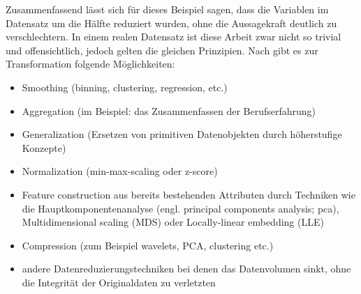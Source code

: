 Zusammenfassend lässt sich für dieses Beispiel sagen, dass die Variablen im Datensatz um die Hälfte reduziert wurden, ohne die Aussagekraft deutlich zu verschlechtern. In einem realen Datensatz ist diese Arbeit zwar nicht so trivial und offensichtlich, jedoch gelten die gleichen Prinzipien.\newline
Nach \citep[S.~71; veränderte Version]{swamynathan_mastering_2017} gibt es zur Transformation folgende Möglichkeiten:
\begin{itemize}
\item Smoothing (binning, clustering, regression, etc.)
\item Aggregation (im Beispiel: das Zusammenfassen der Berufserfahrung)
\item Generalization (Ersetzen von primitiven Datenobjekten durch höherstufige Konzepte)
\item Normalization (min-max-scaling oder z-score)
\item Feature construction aus bereits bestehenden Attributen durch Techniken wie die Hauptkomponentenanalyse (engl. principal components analysis; \gls{pca}), Multidimensional scaling (MDS) oder Locally-linear embedding (LLE)
\item Compression (zum Beispiel wavelets, PCA, clustering etc.)
\item andere Datenreduzierungstechniken bei denen das Datenvolumen sinkt, ohne die Integrität der Originaldaten zu verletzten
\end{itemize}


